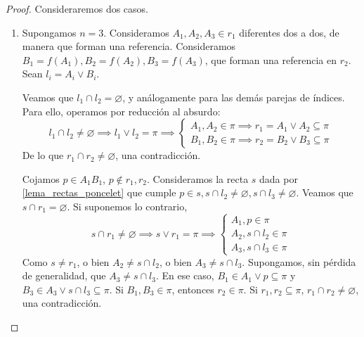 \begin{proof}
    Consideraremos dos casos.
    \begin{enumerate}
        \item Supongamos $n = 3$. Consideramos $A_1, A_2, A_3 \in
        r_1$ diferentes dos a dos, de manera que forman una
        referencia. Consideramos $B_1 = f(A_1), B_2 = f(A_2),
        B_3 = f(A_3)$, que forman una referencia en $r_2$.
        Sean $l_i = A_i \vee B_i$.
        
        Veamos que $l_1 \cap l_2 = \varnothing$, y análogamente
        para las demás parejas de índices. Para ello, operamos
        por reducción al absurdo:
        \[
        l_1 \cap l_2 \neq \varnothing \implies l_1 \vee l_2 = \pi
        \implies
        \begin{cases}
        A_1, A_2 \in \pi \implies r_1 = A_1 \vee A_2 \subseteq \pi\\
        B_1, B_2 \in \pi \implies r_2 = B_2 \vee B_3 \subseteq \pi
        \end{cases}
        \]
        De lo que $r_1 \cap r_2 \neq \varnothing$,
        una contradicción.
        
        Cojamos $p \in A_1 B_1$, $p \not \in r_1, r_2$. Consideramos
        la recta $s$ dada por \ref{lema_rectas_poncelet} que cumple
        $p \in s, s \cap l_2 \neq \varnothing, s \cap l_3 \neq 
        \varnothing$. Veamos que $s \cap r_1 = \varnothing$. Si 
        suponemos lo contrario,
        \[
        s \cap r_1 \neq \varnothing \implies s \vee r_1 = \pi
        \implies
        \begin{cases}
        A_1, p \in \pi \\
        A_2, s \cap l_2 \in \pi \\
         A_3, s \cap l_3 \in \pi 
        \end{cases}
        \]
        Como $s \neq r_1$, o bien $A_2 \neq s \cap l_2$, o bien 
         $A_3 \neq s \cap l_3$. Supongamos, sin pérdida de generalidad,
         que $A_3 \neq s \cap l_3$. En ese caso, $B_1 \in A_1 
         \vee p \subseteq \pi$ y $B_3 \in A_3 \vee s \cap l_3 \subseteq
         \pi$. Si $B_1, B_3 \in \pi$, 
         entonces $r_2 \in \pi$. Si $r_1, r_2 \subseteq
         \pi$, $r_1 \cap r_2 \neq \varnothing$, una contradicción.
         

\end{enumerate}
\end{proof}
